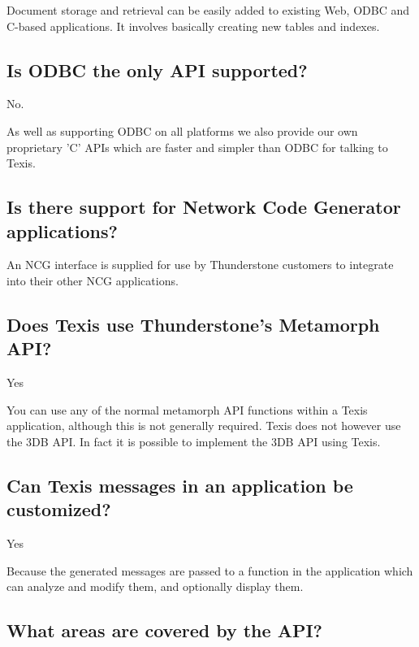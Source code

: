 Document storage and retrieval can be easily added to existing Web, ODBC
and C-based applications.  It involves basically creating new tables
and indexes.

\subsection{Is ODBC the only API supported?}

No.

As well as supporting ODBC on all platforms we also provide our own
proprietary 'C' APIs which are faster and simpler than ODBC for talking to
Texis.

\subsection{Is there support for Network Code Generator applications?}

An NCG interface is supplied for use by Thunderstone customers to
integrate into their other NCG applications.

\subsection{Does Texis use Thunderstone's Metamorph API?}

Yes

You can use any of the normal metamorph API functions within a Texis
application, although this is not generally required.  Texis does not
however use the 3DB API.  In fact it is possible to implement the 3DB API
using Texis.

\subsection{Can Texis messages in an application be customized?}
Yes

Because the generated messages are passed to a function in the application
which can analyze and modify them, and optionally display them.

\subsection{What areas are covered by the API?}

